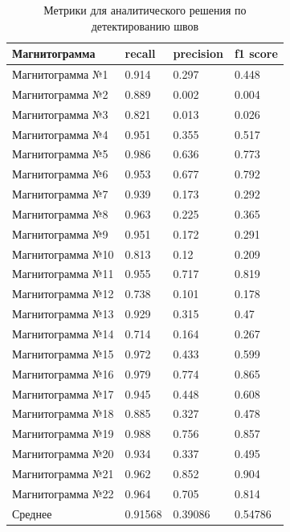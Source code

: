 \documentclass[a4paper,article,14pt]{extarticle}
\begin{document}
\begin{center}
    \begin{longtable}{|p{5cm}|p{3cm}|p{3cm}|p{3cm}|}
        \caption{Метрики для аналитического решения по детектированию швов}\\\hline
        Магнитограмма & recall & precision & f1 score \\ \hline
        Магнитограмма №1 & 0.914 & 0.297 & 0.448 \\ \hline
        Магнитограмма №2 & 0.889 & 0.002 & 0.004 \\ \hline
        Магнитограмма №3 & 0.821 & 0.013 & 0.026 \\ \hline
        Магнитограмма №4 & 0.951 & 0.355 & 0.517 \\ \hline
        Магнитограмма №5 & 0.986 & 0.636 & 0.773 \\ \hline
        Магнитограмма №6 & 0.953 & 0.677 & 0.792 \\ \hline
        Магнитограмма №7 & 0.939 & 0.173 & 0.292 \\ \hline
        Магнитограмма №8 & 0.963 & 0.225 & 0.365 \\ \hline
        Магнитограмма №9 & 0.951 & 0.172 & 0.291 \\ \hline
        Магнитограмма №10 & 0.813 & 0.12 & 0.209 \\ \hline
        Магнитограмма №11 & 0.955 & 0.717 & 0.819 \\ \hline
        Магнитограмма №12 & 0.738 & 0.101 & 0.178 \\ \hline
        Магнитограмма №13 & 0.929 & 0.315 & 0.47 \\ \hline
        Магнитограмма №14 & 0.714 & 0.164 & 0.267 \\ \hline
        Магнитограмма №15 & 0.972 & 0.433 & 0.599 \\ \hline
        Магнитограмма №16 & 0.979 & 0.774 & 0.865 \\ \hline
        Магнитограмма №17 & 0.945 & 0.448 & 0.608 \\ \hline
        Магнитограмма №18 & 0.885 & 0.327 & 0.478 \\ \hline
        Магнитограмма №19 & 0.988 & 0.756 & 0.857 \\ \hline
        Магнитограмма №20 & 0.934 & 0.337 & 0.495 \\ \hline
        Магнитограмма №21 & 0.962 & 0.852 & 0.904 \\ \hline
        Магнитограмма №22 & 0.964 & 0.705 & 0.814 \\ \hline
        Среднее & 0.91568 & 0.39086 & 0.54786 \\ \hline
    \end{longtable}
\end{center}
\end{document}
